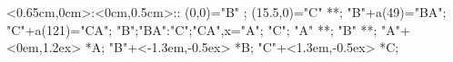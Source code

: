 %

\xy    <0.65cm,0cm>:<0cm,0.5cm>::
       (0,0)="B" ; (15.5,0)="C" **\dir{-}; 
       "B"+a(49)="BA"; "C"+a(121)="CA";
       {"B";"BA":"C";"CA",x}="A"; 
       "C"; "A" **\dir{-}; "B" **\dir{-};
	 "A"+<0em,1.2ex> *{A};
	 "B"+<-1.3em,-0.5ex> *{B};
	 "C"+<1.3em,-0.5ex> *{C};
       \endxy%
